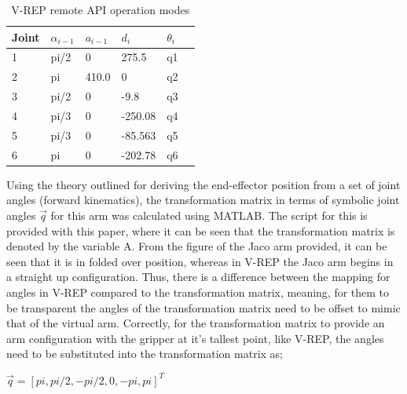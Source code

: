 \documentclass[12pt,openany,a4paper]{book}
\begin{document}
\vspace{\baselineskip}



\begin{center}
\begin{table}[htb]


    \begin{tabular}{| l | l | l | l | l | p{15cm} |}
    \hline
    Joint & $\alpha_{i-1}$ & $a_{i-1}$ & $d_i$ & $\theta_{i}$ \\ \hline
     1 & pi/2 & 0 & 275.5 & q1 \\ \hline
     2 & pi & 410.0 & 0 & q2 \\ \hline
     3 & pi/2 & 0 & -9.8 & q3 \\ \hline
     4 & pi/3 & 0 & -250.08 & q4 \\ \hline
     5 & pi/3 & 0 & -85.563 & q5 \\ \hline
     6 & pi & 0 & -202.78 & q6 \\ \hline
    \end{tabular}
    \caption{V-REP remote API operation modes}
\end{table}
\end{center}

\vspace{\baselineskip}

Using the theory outlined for deriving the end-effector position from a set of joint angles (forward kinematics), the transformation matrix in terms of symbolic joint angles $\vec{q}$ for this arm was calculated using MATLAB. The script for this is provided with this paper, where it can be seen that the transformation matrix is denoted by the variable A. From the figure of the Jaco arm provided, it can be seen that it is in folded over position, whereas in V-REP the Jaco arm begins in a straight up configuration. Thus, there is a difference between the mapping for angles in V-REP compared to the transformation matrix, meaning, for them to be transparent the angles of the transformation matrix need to be offset to mimic that of the virtual arm. Correctly, for the transformation matrix to provide an arm configuration with the gripper at it's tallest point, like V-REP, the angles need to be substituted into the transformation matrix as;

\vspace{\baselineskip}


$\vec{q} = [ pi, pi/2, -pi/2, 0, -pi, pi]^T$

\vspace{\baselineskip}
\end{document}
